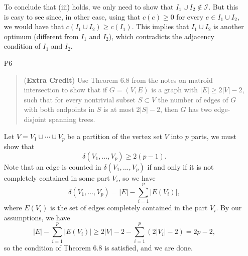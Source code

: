\documentclass[12pt]{article}
\begin{document}
\begin{enumerate}
To conclude that (iii) holds, we only need to show that $I_1 \cup I_2 \not\in \mathcal{I}$. But this is easy to see since, in other case, using that $c(e) \geq 0$ for every $e \in I_1 \cup I_2$, we would have that $c(I_1 \cup I_2) \geq c(I_1)$. This implies that $I_1 \cup I_2$ is another optimum (different from $I_1$ and $I_2$), which contradicts the adjacency condition of $I_1$ and $I_2$.


\item[P6]

\begin{quote}
({\bf Extra Credit}) Use Theorem 6.8 from the notes on matroid intersection to show that if $G = (V,E)$ is a graph with $|E| \ge 2|V|-2$, such that for every nontrivial subset $S \subset V$ the number of edges of $G$ with both endpoints in $S$ is at most $2|S|-2$, then $G$ has two edge-disjoint spanning trees.
\end{quote}

Let $V = V_1 \cup \cdots \cup V_p$ be a partition of the vertex set $V$ into $p$ parts, we must show that
\[
\delta(V_1, ..., V_p) \ge 2(p-1).
\]
Note that an edge is counted in $\delta(V_1, ..., V_p)$ if and only if it is not completely contained in some part $V_i$, so we have
\[
\delta(V_1, ..., V_p) = |E| - \sum_{i=1}^p |E(V_i)|,
\]
where $E(V_i)$ is the set of edges completely contained in the part $V_i$. By our assumptions, we have
\[
|E| - \sum_{i=1}^p |E(V_i)| \ge 2|V|-2 - \sum_{i=1}^p (2|V_i| - 2) = 2p-2,
\]
so the condition of Theorem 6.8 is satisfied, and we are done.





\end{enumerate}
\end{document}
